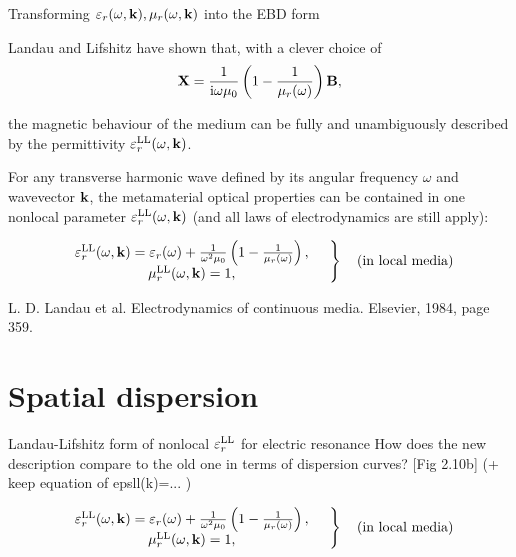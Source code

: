 \documentclass[t]{beamer} \usepackage[english]{babel} \usepackage[utf8]{inputenc} \usetheme{Frankfurt} %
\begin{document}
\begin{frame}[plain]{\tiny{\vspace{-1em}Transforming $\varepsilon_r(\omega,{\mathbf{k}}), \mu_r(\omega,{\mathbf{k}})$ into the EBD form\vspace{-.5em}}}%

Landau and Lifshitz have shown that, with a clever choice of 
\begin{equation*} \mathbf{X} = \frac{1}{{\mathrm i}\omega\mu_0}\left(1 - \frac{1}{\mu_r(\omega)}\right)\mathbf{B}, \label{eq_Xsd}\end{equation*}

the magnetic behaviour of the medium can be fully and unambiguously described by the permittivity $\varepsilon_r^\text{LL}(\omega,{\mathbf{k}})$.
\vfill

For any transverse harmonic wave defined by its angular frequency $\omega$ and wavevector ${\mathbf{k}}$, the metamaterial optical properties can be contained in one nonlocal parameter $\varepsilon_r^\text{LL}(\omega,{\mathbf{k}})$ (and all laws of electrodynamics are still apply):
	\begin{exampleblock}
		\;\vspace{-1em}
	\begin{equation*}
 \left.  \begin{array}{c}
\varepsilon_r^\text{LL}(\omega,{\mathbf{k}}) = \varepsilon_r(\omega)+\frac{1}{\omega^2 \mu_0}\left(1 - \frac{1}{\mu_r(\omega)}\right), \\
\mu_r^\text{LL}(\omega,{\mathbf{k}}) = 1, 
\end{array} \quad \right\} \quad \text{(in local media)} 
	\end{equation*}
	\end{exampleblock}

\begin{scriptsize}L. D. Landau et al. Electrodynamics of continuous media. Elsevier, 1984, page 359. \end{scriptsize}
\end{frame} %

\section{Spatial dispersion}
\begin{frame}{Landau-Lifshitz form of nonlocal $\varepsilon_r^\text{LL}$ for electric resonance}%
How does the new description compare to the old one in terms of dispersion curves?  [Fig 2.10b] (+ keep equation of epsll(k)=... )

\vfill
	\begin{exampleblock}
		\;\vspace{-1em}
	\begin{equation*}
 \left.  \begin{array}{c}
\varepsilon_r^\text{LL}(\omega,{\mathbf{k}}) = \varepsilon_r(\omega)+\frac{1}{\omega^2 \mu_0}\left(1 - \frac{1}{\mu_r(\omega)}\right), \\
\mu_r^\text{LL}(\omega,{\mathbf{k}}) = 1, 
\end{array} \quad \right\} \quad \text{(in local media)} 
	\end{equation*}
	\end{exampleblock}
\end{frame} %
\end{document}
